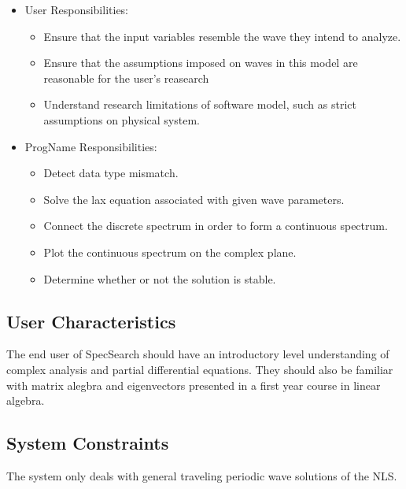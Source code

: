 \documentclass[12pt]{article}
\newcommand{\progname}{ProgName} %
\begin{document}
\begin{itemize}
\item User Responsibilities:
\begin{itemize}
\item Ensure that the input variables resemble the wave they intend to analyze.
\item Ensure that the assumptions imposed on waves in this model are reasonable 
for the user's reasearch
\item Understand research limitations of software model, such as strict 
assumptions on physical system.
\end{itemize}
\item \progname{} Responsibilities:  

\begin{itemize}
\item Detect data type mismatch. 
\item Solve the lax equation associated with given wave parameters. 
\item Connect the discrete spectrum in order to form a continuous spectrum. 
\item Plot the continuous spectrum on the complex plane.
\item Determine whether or not the solution is stable. 
\end{itemize}
\end{itemize}

\subsection{User Characteristics} \label{SecUserCharacteristics}

The end user of SpecSearch should have an introductory level understanding of 
complex analysis and partial differential equations. They should also be 
familiar with matrix alegbra and eigenvectors presented in a first year course 
in linear algebra. 

\subsection{System Constraints}

The system only deals with general traveling periodic wave solutions of the 
NLS. 
\end{document}
